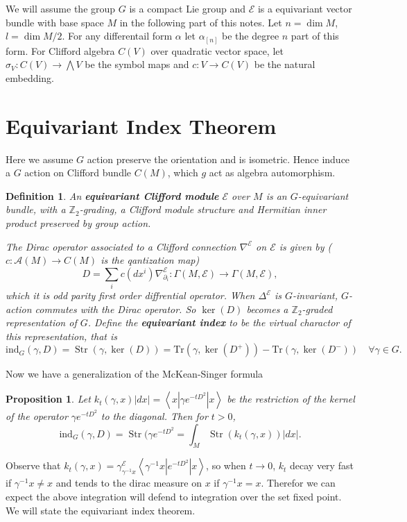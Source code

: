 \documentclass[11pt]{amsart}
\newtheorem{Prop}{Proposition}
\newtheorem{Def}[Thm]{Definition}
\def\cA{{\mathcal{A}}}
\def\cE{{\mathcal{E}}}
\def\bZ{{\mathbb{Z}}}
\def\bZ{{\mathbb{Z}}}
\def\Str{\mathop{\mathrm{Str}}}
\def\kw#1{{\bf \em #1}}
\def\brk#1{\left<{#1}\right>}
\def\ind{\mathrm{ind}}
\def\Tr{\mathrm{Tr}}
\begin{document}
We will assume the group $G$ is a compact Lie group and $\cE$ is a
equivariant vector bundle with base space $M$ in the following part
of this notes. Let $n=\dim M$, $l = \dim M/2$.
For any differentail form $\alpha$ let $\alpha_{[n]}$ be the degree
$n$ part of this form. For Clifford algebra $C(V)$ over quadratic vector space,
let $\sigma_V\colon C(V) \to \bigwedge V$ be the symbol maps and 
$c \colon V \to C(V)$ be the natural embedding.

\section{Equivariant Index Theorem}
Here we assume $G$ action preserve the orientation and is isometric.
Hence induce a $G$ action on Clifford bundle $C(M)$, which $g$ act as algebra
automorphism. 

\begin{Def}
An \kw{equivariant Clifford module} $\cE$ over $M$ 
is an $G$-equivariant bundle, with a $\bZ_2$-grading, 
a Clifford module structure 
and Hermitian inner product preserved by group action.

The Dirac operator associated to a Clifford connection $\nabla^\cE$ on $\cE$
is given by ($c\colon \cA(M) \to C(M)$ is the qantization map)
\[
D = \sum_i c(dx^i)\nabla^\cE_{\partial_i}\colon \Gamma(M,\cE) \to \Gamma(M,\cE),
\]
which it is odd parity first order diffrential operator.
When $\Delta^\cE$ is $G$-invariant, $G$-action commutes with the Dirac operator.
So $\ker(D)$ becomes a $\bZ_2$-graded representation of $G$.
Define the \kw{equivariant index} to be the virtual charactor of this representation, that is 
\[
\ind_G(\gamma, D) = \Str(\gamma, \ker(D)) 
= \Tr(\gamma,\ker(D^+)) - \Tr(\gamma,\ker(D^-))\quad \forall \gamma\in G.
\]
\end{Def}

Now we have a generalization of the McKean-Singer formula
\begin{Prop}
Let $k_t(\gamma, x)|dx|=\brk{x|\gamma e^{-tD^2}|x}$ be the restriction of the
kernel of the operator $\gamma e^{-tD^2}$ to the 
diagonal. Then for $t>0$, 
\[
\ind_G(\gamma,D) = \Str(\gamma e^{-tD^2} = \int_M \Str(k_t(\gamma,x))|dx|.
\]
\end{Prop}

Observe that $k_t(\gamma,x) = \gamma^\cE_{\gamma^{-1}x}\brk{\gamma^{-1}x|e^{-tD^2}|x}$,
so when $t\to 0$, $k_t$ decay very fast if $\gamma^{-1}x \neq x$ and 
tends to the dirac measure on $x$ if $\gamma^{-1}x=x$.
Therefor we can expect the above integration will defend to integration
over the set fixed point. We will state the equivariant index theorem.
\end{document}
